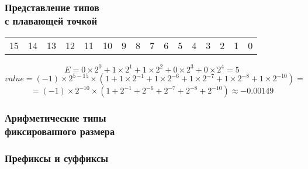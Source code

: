 \documentclass[compress, 8pt]{beamer}
\newenvironment{sixteenbit}{%
    \begin{center}
        \begin{tabular}{ |m{0.2cm}|m{0.2cm}|m{0.2cm}|m{0.2cm}|m{0.2cm}|m{0.2cm}|m{0.2cm}|m{0.2cm}|m{0.2cm}|m{0.2cm}|m{0.2cm}|m{0.2cm}|m{0.2cm}|m{0.2cm}|m{0.2cm}|m{0.2cm}|  }
            \hline
}{
        \hline
        \multicolumn{1}{c}{\color{gray}\tiny{15}} &
        \multicolumn{1}{c}{\color{gray}\tiny{14}} &
        \multicolumn{1}{c}{\color{gray}\tiny{13}} &
        \multicolumn{1}{c}{\color{gray}\tiny{12}} &
        \multicolumn{1}{c}{\color{gray}\tiny{11}} &
        \multicolumn{1}{c}{\color{gray}\tiny{10}} &
        \multicolumn{1}{c}{\color{gray}\tiny{9}} &
        \multicolumn{1}{c}{\color{gray}\tiny{8}} &
        \multicolumn{1}{c}{\color{gray}\tiny{7}} &
        \multicolumn{1}{c}{\color{gray}\tiny{6}} &
        \multicolumn{1}{c}{\color{gray}\tiny{5}} &
        \multicolumn{1}{c}{\color{gray}\tiny{4}} &
        \multicolumn{1}{c}{\color{gray}\tiny{3}} &
        \multicolumn{1}{c}{\color{gray}\tiny{2}} &
        \multicolumn{1}{c}{\color{gray}\tiny{1}} &
        \multicolumn{1}{c}{\color{gray}\tiny{0}} \\
        \end{tabular}
    \end{center}
}
\begin{document}
\begin{frame}[fragile]

    \frametitle{Представление типов \\ с плавающей точкой}

    \begin{sixteenbit}
        \cellcolor{blue!40!white}{1} &
        \cellcolor{green!40!white}{0} &
        \cellcolor{green!40!white}{0} &
        \cellcolor{green!40!white}{1} &
        \cellcolor{green!40!white}{1} &
        \cellcolor{green!40!white}{0} &
        \cellcolor{red!40!white}{1} &
        \cellcolor{red!40!white}{0} &
        \cellcolor{red!40!white}{0} &
        \cellcolor{red!40!white}{0} &
        \cellcolor{red!40!white}{0} &
        \cellcolor{red!40!white}{1} &
        \cellcolor{red!40!white}{1} &
        \cellcolor{red!40!white}{1} &
        \cellcolor{red!40!white}{0} &
        \cellcolor{red!40!white}{1} \\
    \end{sixteenbit}

    \begin{displaymath}
        E =
            0 \times 2^0 +
            1 \times 2^1 +
            1 \times 2^2 +
            0 \times 2^3 +
            0 \times 2^4 =
            5
    \end{displaymath}
    \begin{displaymath}
        value = (-1) \times 2^{5-15} \times (
            1 +
            1 \times 2^{-1} +
            1 \times 2^{-6} +
            1 \times 2^{-7} +
            1 \times 2^{-8} +
            1 \times 2^{-10}
        ) =
    \end{displaymath}
    \begin{displaymath}
        = (-1) \times 2^{-10} \times (
            1 +
            2^{-1} +
            2^{-6} +
            2^{-7} +
            2^{-8} +
            2^{-10}
        ) \approx -0.00149
    \end{displaymath}

\end{frame}

\begin{frame}[fragile]

    \frametitle{Арифметические типы \\ фиксированного размера}

\end{frame}

\begin{frame}[fragile]

    \frametitle{Префиксы и суффиксы}

\end{frame}
\end{document}
